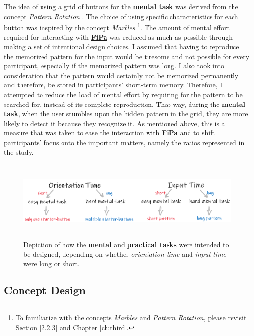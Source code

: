 The idea of using a grid of buttons for the \textbf{mental task} was derived from the concept \textit{Pattern Rotation} \cite{Marbles, Zezschwitz}. The choice of using specific characteristics for each button was inspired by the concept \textit{Marbles} \cite{Marbles, Zezschwitz} \footnote{To familiarize with the concepts \textit{Marbles} and \textit{Pattern Rotation}, please revisit Section \ref{2.2.3} and Chapter \ref{ch:third}.}. The amount of mental effort required for interacting with \underline{\textbf{FiPa}} was reduced as much as possible through making a set of intentional design choices. I assumed that having to reproduce the memorized pattern for the input would be tiresome and not possible for every participant, especially if the memorized pattern was long. I also took into consideration that the pattern would certainly not be memorized permanently and therefore, be stored in participants' short-term memory. Therefore, I attempted to reduce the load of mental effort by requiring for the pattern to be searched for, instead of its complete reproduction. That way, during the \textbf{mental task}, when the user stumbles upon the hidden pattern in the grid, they are more likely to detect it because they recognize it. As mentioned above, this is a measure that was taken to ease the interaction with \underline{\textbf{FiPa}} and to shift participants' focus onto the important matters, namely the ratios represented in the study.

\begin{figure}[t!]
\centering
\includegraphics[width=13cm, height=4cm]{Chapters/graphics/OriInput.PNG}
\caption{Depiction of how the \textbf{mental} and \textbf{practical tasks} were intended to be designed, depending on whether \textit{orientation time} and \textit{input time} were long or short.}
\label{fig:orientation_input}
\end{figure}

\subsection{Concept Design} \label{4.2.2}

